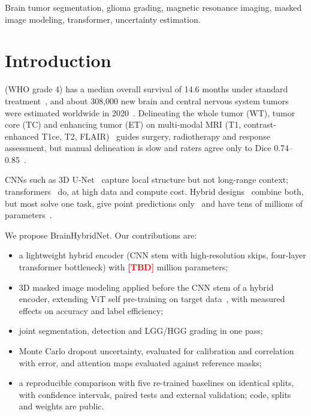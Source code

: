 \documentclass[journal]{IEEEtran}
\newcommand{\tbd}[1][]{\textcolor{red}{\textbf{[TBD#1]}}}
\begin{document}
\begin{IEEEkeywords}
Brain tumor segmentation, glioma grading, magnetic resonance imaging, masked image modeling, transformer, uncertainty estimation.
\end{IEEEkeywords}

\section{Introduction}
 (WHO grade 4) has a median overall survival of 14.6 months under standard treatment~\cite{stupp2005}, and about 308,000 new brain and central nervous system tumors were estimated worldwide in 2020~\cite{sung2021globocan}. Delineating the whole tumor (WT), tumor core (TC) and enhancing tumor (ET) on multi-modal MRI (T1, contrast-enhanced T1ce, T2, FLAIR)~\cite{gordillo2013} guides surgery, radiotherapy and response assessment, but manual delineation is slow and raters agree only to Dice 0.74--0.85~\cite{menze2015}.

CNNs such as 3D U-Net~\cite{ronneberger2015,cicek2016} capture local structure but not long-range context; transformers~\cite{vaswani2017,dosovitskiy2021} do, at high data and compute cost. Hybrid designs~\cite{chen2021transunet,wang2021transbts,wu2023dformer} combine both, but most solve one task, give point predictions only~\cite{gal2016} and have tens of millions of parameters~\cite{ker2018}.

We propose BrainHybridNet. Our contributions are:
\begin{itemize}
\item a lightweight hybrid encoder (CNN stem with high-resolution skips, four-layer transformer bottleneck) with \tbd{} million parameters;
\item 3D masked image modeling applied before the CNN stem of a hybrid encoder, extending ViT self pre-training on target data~\cite{zhou2023selfmae}, with measured effects on accuracy and label efficiency;
\item joint segmentation, detection and LGG/HGG grading in one pass;
\item Monte Carlo dropout uncertainty, evaluated for calibration and correlation with error, and attention maps evaluated against reference masks;
\item a reproducible comparison with five re-trained baselines on identical splits, with confidence intervals, paired tests and external validation; code, splits and weights are public.
\end{itemize}
\end{document}

